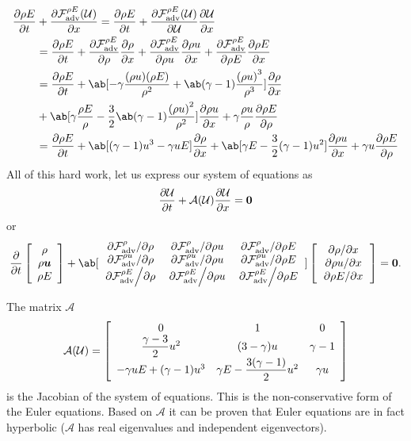 \documentclass[justified, nobib]{tufte-handout}
\begin{document}
\[
	\begin{split}
		\pdv{\rho E }{t} & + \pdv{\F^{\rho E}(\U)}{x}
		= \pdv{\rho E}{t} + \pdv{\F^{\rho E}(\U)}{\U}\pdv{\U}{x}                                                                 \\
		                 & =  \pdv{\rho E}{t}
		+ \pdv{\F^{\rho E}}{\rho }\pdv{\rho }{x}
		+ \pdv{\F^{\rho E}}{\rho u}\pdv{\rho u}{x}
		+ \pdv{\F^{\rho E}}{\rho E}\pdv{\rho E}{x}                                                                               \\
		                 & =  \pdv{\rho E}{t}
		+ \ab[-\gamma\frac{(\rho u)(\rho E)}{\rho^2} + \ab(\gamma-1)\frac{{(\rho u)}^3}{\rho^3} ]\pdv{\rho}{x}                   \\
		                 & + \ab[\gamma\frac{\rho E}{\rho} - \frac{3}{2}\ab(\gamma-1)\frac{{(\rho u)}^2}{\rho^2}]\pdv{\rho u}{x}
		+ \gamma\frac{\rho u}{\rho} \pdv{\rho E}{\rho}                                                                           \\
		                 & =  \pdv{\rho E}{t} + \ab[(\gamma -1)u^3-\gamma u E ]\pdv{\rho}{x}
		+ \ab[\gamma E - \frac{3}{2}(\gamma -1)u^2]\pdv{\rho u}{x}
		+ \gamma u\pdv{\rho E}{\rho}
	\end{split}
\]
\def\A{\mathcal{A}}
All of this hard work, let us express our system of equations as
\[
	\pdv{\U}{t} + \A(\U)\pdv{\U}{x} = \bm{0}
\]
or
\[
	\pdv{}{t}\left[
		\begin{array}{c}
			\rho        \\
			\rho \bm{u} \\
			\rho E
		\end{array} \right] +
	\ab[\begin{array}{ccc}
			\pdv{\F^\rho}/{\rho}
			 & \pdv{\F^\rho}/{\rho u}
			 & \pdv{\F^\rho}/{\rho E}     \\
			\pdv{\F^{\rho u}}/{\rho }
			 & \pdv{\F^{\rho u}}/{\rho u}
			 & \pdv{\F^{\rho u}}/{\rho E} \\
			\pdv{\F^{\rho E}}/{\rho }
			 & \pdv{\F^{\rho E}}/{\rho u}
			 & \pdv{\F^{\rho E}}/{\rho E}
		\end{array}]
	\left[
		\begin{array}{c}
			\pdv{\rho}/{x}   \\
			\pdv{\rho u}/{x} \\
			\pdv{\rho E}/{x}
		\end{array} \right]
	= \bm{0}.
\]
\def\A{\mathcal{A}}

The matrix \(\A\)
\[
	\A(\U) =  \left[
		\begin{array}{ccc}
			0                            & 1                                     & 0          \\
			\dfrac{\gamma -3}{2}u^2      & (3 - \gamma)u                         & \gamma - 1 \\
			-\gamma u E + (\gamma -1)u^3 & \gamma E - \dfrac{3(\gamma -1)}{2}u^2 & \gamma u
		\end{array} \right]
\]
is the Jacobian of the system of equations.
This is the non-conservative form of the Euler equations.
Based on \(\A\) it can be proven that Euler equations are in fact
hyperbolic (\(\A\) has real eigenvalues and independent eigenvectors).
\end{document}
